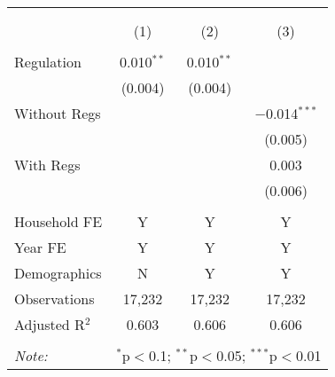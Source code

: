 
\begin{table}[!htbp] \centering 
  \caption{} 
  \label{} 
\begin{tabular}{@{\extracolsep{5pt}}lccc} 
\\[-1.8ex]\hline 
\hline \\[-1.8ex] 
\\[-1.8ex] & (1) & (2) & (3)\\ 
\hline \\[-1.8ex] 
 Regulation & 0.010$^{**}$ & 0.010$^{**}$ &  \\ 
  & (0.004) & (0.004) &  \\ 
  Without Regs &  &  & $-$0.014$^{***}$ \\ 
  &  &  & (0.005) \\ 
  With Regs &  &  & 0.003 \\ 
  &  &  & (0.006) \\ 
 \hline \\[-1.8ex] 
Household FE & Y & Y & Y \\ 
Year FE & Y & Y & Y \\ 
Demographics & N & Y & Y \\ 
Observations & 17,232 & 17,232 & 17,232 \\ 
Adjusted R$^{2}$ & 0.603 & 0.606 & 0.606 \\ 
\hline 
\hline \\[-1.8ex] 
\textit{Note:}  & \multicolumn{3}{l}{$^{*}$p$<$0.1; $^{**}$p$<$0.05; $^{***}$p$<$0.01} \\ 
\end{tabular} 
\end{table} 
